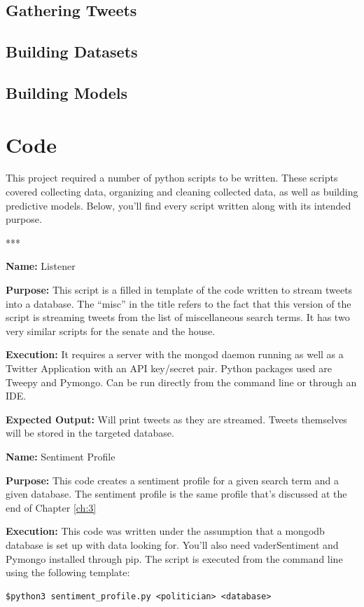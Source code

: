 \documentclass[11pt, twoside, reqno]{book}
\begin{document}
\begin{appendices}
\section{Gathering Tweets}

\section{Building Datasets}

\section{Building Models}

\chapter{Code}
This project required a number of python scripts to be written. These scripts covered collecting data, organizing and cleaning collected data, as well as building predictive models. Below, you'll find every script written along with its intended purpose.

\centerline{***}

\textbf{Name:} Listener

\textbf{Purpose:} This script is a filled in template of the code written to stream tweets into a database. The ``misc'' in the title refers to the fact that this version of the script is streaming tweets from the list of miscellaneous search terms. It has two very similar scripts for the senate and the house. 

\textbf{Execution:} It requires a server with the mongod daemon running as well as a Twitter Application with an API key/secret pair. Python packages used are Tweepy and Pymongo. Can be run directly from the command line or through an IDE. 

\textbf{Expected Output:} Will print tweets as they are streamed. Tweets themselves will be stored in the targeted database. 



\newpage

\textbf{Name:} Sentiment Profile

\textbf{Purpose:} This code creates a sentiment profile for a given search term and a given database. The sentiment profile is the same profile that's discussed at the end of Chapter \ref{ch:3}

\textbf{Execution:} This code was written under the assumption that a mongodb database is set up with data looking for. You'll also need vaderSentiment and Pymongo installed through pip. The script is executed from the command line using the following template:
\begin{verbatim}
$python3 sentiment_profile.py <politician> <database>
\end{verbatim}


\end{appendices}
\end{document}
